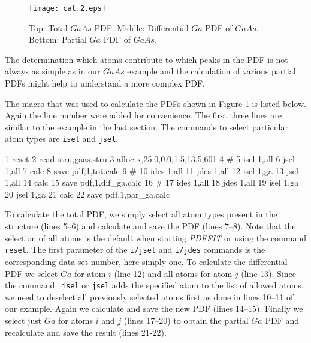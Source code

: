 \begin{figure}[!htb]
   \centering
   \texttt{[image: cal.2.eps]}
   \caption[Total, differential and partial PDF of $GaAs$]
           {Top: Total $GaAs$ PDF. Middle: Differential $Ga$ PDF of
            $GaAs$. Bottom: Partial $Ga$ PDF of $GaAs$.}
   \label{cal-fig2}
\end{figure}

The determination which atoms contribute to which peaks in the PDF
is not always as simple as in our $GaAs$ example and the calculation
of various partial PDFs might help to understand a more complex
PDF. \par

The macro that was used to calculate the PDFs shown in Figure \ref{cal-fig2}
is listed below. Again the line number were added for convenience. The
first three lines are similar to the example in the last section. The
commands to select particular atom types are {\tt isel} and {\tt jsel}.

\footnotesize
\begin{MacVerbatim}
      1 reset
      2 read stru,gaas.stru
      3 alloc x,25.0,0.0,1.5,13.5,601
      4 #
      5 isel 1,all
      6 jsel 1,all
      7 calc
      8 save pdf,1,tot.calc
      9 #
     10 ides 1,all
     11 jdes 1,all
     12 isel 1,ga
     13 jsel 1,all
     14 calc
     15 save pdf,1,dif_ga.calc
     16 #
     17 ides 1,all
     18 jdes 1,all
     19 isel 1,ga
     20 jsel 1,ga
     21 calc
     22 save pdf,1,par_ga.calc
\end{MacVerbatim}
\normalsize

\noindent To calculate the total PDF, we simply select all atom
types present in the structure (lines 5--6) and calculate and save
the PDF (lines 7--8). Note that the selection of all atoms is the
default when starting {\it PDFFIT} or using the command {\tt
reset}. The first parameter of the {\tt i/jsel} and {\tt i/jdes}
commands is the corresponding data set number, here simply one. To
calculate the differential PDF we select $Ga$ for atom $i$ (line
12) and all atoms for atom $j$ (line 13). Since the command {\tt
isel} or {\tt jsel} adds the specified atom to the list of allowed
atoms, we need to deselect all previously selected atoms first as
done in lines 10--11 of our example. Again we calculate and save
the new PDF (lines 14--15). Finally we select just $Ga$ for atoms
$i$ and $j$ (lines 17--20) to obtain the partial $Ga$ PDF and
recalculate and save the result (lines 21-22). \par

